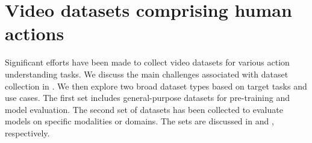 \section{Video datasets comprising human actions}
\label{sec:datasets}

Significant efforts have been made to collect video datasets for various action understanding tasks. We discuss the main challenges associated with dataset collection in . We then explore two broad dataset types based on target tasks and use cases. The first set includes general-purpose datasets for pre-training and model evaluation. The second set of datasets has been collected to evaluate models on specific modalities or domains. The sets are discussed in  and , respectively.



